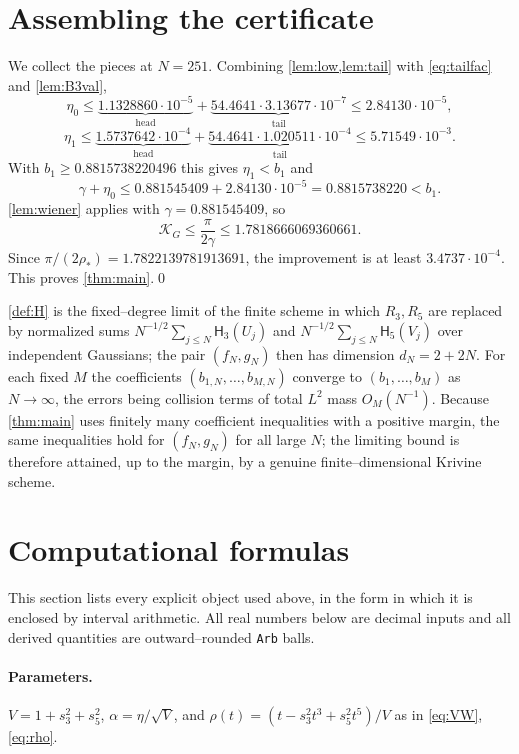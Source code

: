 \documentclass[12pt]{article}
\providecommand{\KG}{\mathcal{K}_G}
\providecommand{\rhostar}{\rho_*}
\newcommand{\He}{\mathsf{H}}                 %
\newcommand{\gam}{\gamma}
\begin{document}
\section{Assembling the certificate}\label{sec:certificate}

We collect the pieces at $N=251$.  Combining \cref{lem:low,lem:tail} with
\eqref{eq:tailfac} and \cref{lem:B3val},
\[
   \eta_0\le\underbrace{1.1328860\cdot10^{-5}}_{\text{head}}
            +\underbrace{54.4641\cdot3.13677\cdot10^{-7}}_{\text{tail}}
      \le 2.84130\cdot10^{-5},
\]
\[
   \eta_1\le\underbrace{1.5737642\cdot10^{-4}}_{\text{head}}
            +\underbrace{54.4641\cdot1.020511\cdot10^{-4}}_{\text{tail}}
      \le 5.71549\cdot10^{-3}.
\]
With $b_1\ge0.8815738220496$ this gives $\eta_1<b_1$ and
\[
   \gam+\eta_0\le 0.881545409+2.84130\cdot10^{-5}
              = 0.8815738220 < b_1 .
\]
\cref{lem:wiener} applies with $\gam=0.881545409$, so
\[
   \KG\le\frac{\pi}{2\gam}\le 1.7818666069360661 .
\]
Since $\pi/(2\rhostar)=1.7822139781913691$, the improvement is at least
$3.4737\cdot10^{-4}$.  This proves \cref{thm:main}.\qed

\begin{remark}\label{rem:transfer}
\cref{def:H} is the fixed--degree limit of the finite scheme in which $R_3,R_5$
are replaced by normalized sums $N^{-1/2}\sum_{j\le N}\He_3(U_j)$ and
$N^{-1/2}\sum_{j\le N}\He_5(V_j)$ over independent Gaussians; the pair
$(f_N,g_N)$ then has dimension $d_N=2+2N$.  For each fixed $M$ the coefficients
$(b_{1,N},\dots,b_{M,N})$ converge to $(b_1,\dots,b_M)$ as $N\to\infty$, the
errors being collision terms of total $L^2$ mass $O_M(N^{-1})$.  Because
\cref{thm:main} uses finitely many coefficient inequalities with a positive
margin, the same inequalities hold for $(f_N,g_N)$ for all large $N$; the
limiting bound is therefore attained, up to the margin, by a genuine
finite--dimensional Krivine scheme.
\end{remark}

\section{Computational formulas}\label{sec:formulas}

This section lists every explicit object used above, in the form in which it is
enclosed by interval arithmetic.  All real numbers below are decimal inputs and
all derived quantities are outward--rounded \texttt{Arb} balls.

\paragraph{Parameters.}
$V=1+s_3^2+s_5^2$, $\alpha=\eta/\sqrt V$, and
$\rho(t)=(t-s_3^2t^3+s_5^2t^5)/V$ as in \eqref{eq:VW},\eqref{eq:rho}.
\end{document}
